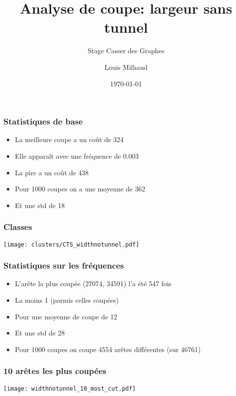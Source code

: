\documentclass[aspectratio=169]{beamer}
\title{Analyse de coupe: largeur sans tunnel}
\subtitle{Stage Casser des Graphes}
\author{Louis Milhaud}
\institute{Complex Networks - LIP6}
\date{\today}
\begin{document}
    \begin{frame}
        \titlepage
    \end{frame}

    \begin{frame}
        \frametitle{Statistiques de base}
        
        \begin{itemize}
            \item La meilleure coupe a un coût de 324
            \item Elle apparaît avec une fréquence de 0.003
            \item La pire a un coût de 438
            \item Pour 1000 coupes on a une moyenne de 362
            \item Et une std de 18
        \end{itemize}
    
    \end{frame}

    \begin{frame}
        \frametitle{Classes}
        \centering
        \texttt{[image: clusters/CTS\_widthnotunnel.pdf]}    
    \end{frame}

    \begin{frame}
        \frametitle{Statistiques sur les fréquences}

        \begin{itemize}
            \item L'arête la plus coupée (27074, 34591) l'a été 547 fois
            \item La moins 1 (parmis celles coupées)
            \item Pour une moyenne de coupe de 12
            \item Et une std de 28
            \item Pour 1000 coupes on coupe 4554 arêtes différentes (sur 46761)
        \end{itemize}
    
    \end{frame}

    \begin{frame}
        \frametitle{10 arêtes les plus coupées}
        \centering
        \texttt{[image: widthnotunnel\_10\_most\_cut.pdf]}    
    \end{frame}
\end{document}
